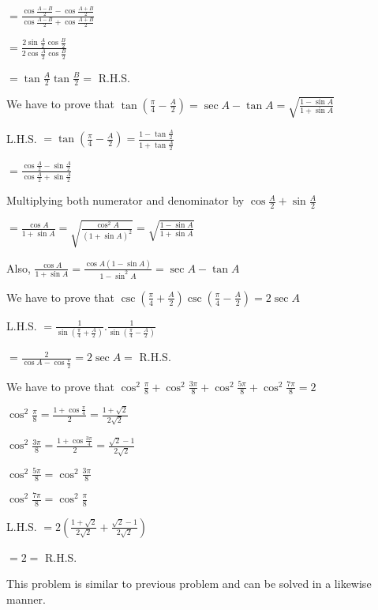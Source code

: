   $= \frac{\cos\frac{A - B}{2} - \cos \frac{A + B}{2}}{\cos\frac{A - B}{2} + \cos \frac{A + B}{2}}$

  $= \frac{2\sin\frac{A}{2}\cos\frac{B}{2}}{2\cos\frac{A}{2}\cos\frac{B}{2}}$

  $= \tan \frac{A}{2}\tan \frac{B}{2} =$ R.H.S.

\item We have to prove that $\tan \left(\frac{\pi}{4} - \frac{A}{2}\right) = \sec A - \tan A = \sqrt{\frac{1 - \sin A}{1 +
    \sin A}}$

  L.H.S. $= \tan \left(\frac{\pi}{4} - \frac{A}{2}\right) = \frac{1 - \tan \frac{A}{2}}{1 + \tan \frac{A}{2}}$

  $= \frac{\cos\frac{A}{2} - \sin \frac{A}{2}}{\cos\frac{A}{2} + \sin \frac{A}{2}}$

  Multiplying both numerator and denominator by $\cos\frac{A}{2} + \sin\frac{A}{2}$

  $= \frac{\cos A}{1 + \sin A} = \sqrt{\frac{\cos^2A}{(1 + \sin A)^2}} = \sqrt{\frac{1 - \sin A}{1 + \sin A}}$

  Also, $\frac{\cos A}{1 + \sin A} = \frac{\cos A(1 - \sin A)}{1 - \sin^2A} = \sec A - \tan A$

\item We have to prove that $\csc\left(\frac{\pi}{4} + \frac{A}{2}\right)\csc \left(\frac{\pi}{4} - \frac{A}{2}\right) =
  2\sec A$

  L.H.S. $= \frac{1}{\sin\left(\frac{\pi}{4} + \frac{A}{2}\right)}.\frac{1}{\sin\left(\frac{\pi}{4} -
    \frac{A}{2}\right)}$

  $= \frac{2}{\cos A - \cos \frac{\pi}{2}} = 2\sec A =$ R.H.S.

\item We have to prove that $\cos^2\frac{\pi}{8} + \cos^2\frac{3\pi}{8} + \cos^2\frac{5\pi}{8} + \cos^2\frac{7\pi}{8} = 2$

  $\cos^2\frac{\pi}{8} = \frac{1 + \cos \frac{\pi}{4}}{2} = \frac{1 + \sqrt{2}}{2\sqrt{2}}$

  $\cos^2\frac{3\pi}{8} = \frac{1 + \cos \frac{3\pi}{4}}{2} = \frac{\sqrt{2} - 1}{2\sqrt{2}}$

  $\cos^2\frac{5\pi}{8} = \cos^2\frac{3\pi}{8}$

  $\cos^2\frac{7\pi}{8} = \cos^2\frac{\pi}{8}$

  L.H.S. $= 2\left(\frac{1 + \sqrt{2}}{2\sqrt{2}} + \frac{\sqrt{2} - 1}{2\sqrt{2}}\right)$

  $= 2 =$ R.H.S.

\item This problem is similar to previous problem and can be solved in a likewise manner.

